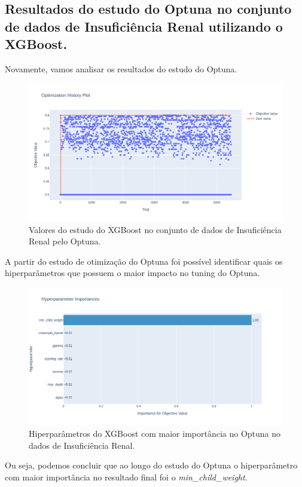 \subsection{Resultados do estudo do Optuna no conjunto de dados de Insuficiência Renal utilizando o XGBoost.}
Novamente, vamos analisar os resultados do estudo do Optuna.
\begin{figure}[H]
 \caption{Valores do estudo do XGBoost no conjunto de dados de Insuficiência Renal pelo Optuna.}
 \label{fig:op:kind:trials:xgb}
 \centering
 \includegraphics[scale=0.4]{images/optuna_xgboost_kindey.png}
\end{figure}
A partir do estudo de otimização do Optuna foi possível identificar quais os hiperparâmetros que possuem o maior impacto no tuning do Optuna.
\begin{figure}[H]
 \caption{Hiperparâmetros do XGBoost com maior importância no Optuna no dados de Insuficiência Renal.}
 \label{fig:op:kind:impo:xgb}
 \centering
 \includegraphics[scale=0.4]{images/optuna_xgboost_importance_kidney.png}
\end{figure}
Ou seja, podemos concluir que ao longo do estudo do Optuna o hiperparâmetro com maior importância no resultado final foi o \textit{min\_child\_weight}.

